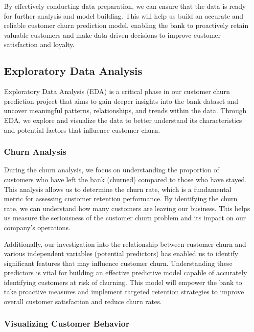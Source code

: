 \documentclass{article}
\begin{document}
\begin{multicols}{2}
By effectively conducting data preparation, we can ensure that the data is ready for further analysis and model building. This will help us build an accurate and reliable customer churn prediction model, enabling the bank to proactively retain valuable customers and make data-driven decisions to improve customer satisfaction and loyalty.

\subsection{Exploratory Data Analysis}

Exploratory Data Analysis (EDA) is a critical phase in our customer churn prediction project that aims to gain deeper insights into the bank dataset and uncover meaningful patterns, relationships, and trends within the data. Through EDA, we explore and visualize the data to better understand its characteristics and potential factors that influence customer churn.

\subsubsection{Churn Analysis}

During the churn analysis, we focus on understanding the proportion of customers who have left the bank (churned) compared to those who have stayed. This analysis allows us to determine the churn rate, which is a fundamental metric for assessing customer retention performance. By identifying the churn rate, we can understand how many customers are leaving our business. This helps us measure the seriousness of the customer churn problem and its impact on our company's operations.

Additionally, our investigation into the relationship between customer churn and various independent variables (potential predictors) has enabled us to identify significant features that may influence customer churn. Understanding these predictors is vital for building an effective predictive model capable of accurately identifying customers at risk of churning. This model will empower the bank to take proactive measures and implement targeted retention strategies to improve overall customer satisfaction and reduce churn rates.

\subsubsection{Visualizing Customer Behavior}


\end{multicols}
\end{document}
